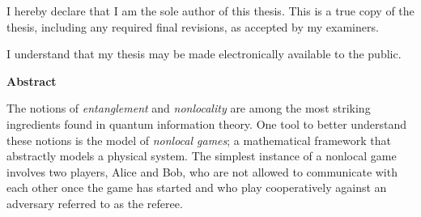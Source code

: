 \pagestyle{plain}
\setcounter{page}{2}

\cleardoublepage %
 


  \noindent
I hereby declare that I am the sole author of this thesis. This is a true copy of the thesis, including any required final revisions, as accepted by my examiners.

  \bigskip
  
  \noindent
I understand that my thesis may be made electronically available to the public.

\cleardoublepage


\begin{center}\textbf{Abstract}\end{center}

The notions of \emph{entanglement} and \emph{nonlocality} are among the most striking ingredients found in quantum information theory. One tool to better understand these notions is the model of \emph{nonlocal games}; a mathematical framework that abstractly models a physical system. The simplest instance of a nonlocal game involves two players, Alice and Bob, who are not allowed to communicate with each other once the game has started and who play cooperatively against an adversary referred to as the referee. 


